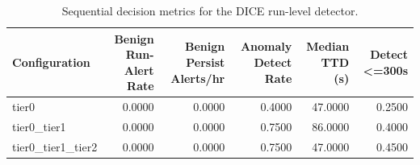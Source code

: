 \begin{table}[t]
\centering
\caption{Sequential decision metrics for the DICE run-level detector.}
\label{tab:dice_sequential_metrics}
\footnotesize
\begin{tabular}{lrrrrr}
\toprule
Configuration & Benign Run-Alert Rate & Benign Persist Alerts/hr & Anomaly Detect Rate & Median TTD (s) & Detect <=300s \\
\midrule
tier0 & 0.0000 & 0.0000 & 0.4000 & 47.0000 & 0.2500 \\
tier0_tier1 & 0.0000 & 0.0000 & 0.7500 & 86.0000 & 0.4000 \\
tier0_tier1_tier2 & 0.0000 & 0.0000 & 0.7500 & 47.0000 & 0.4500 \\
\bottomrule
\end{tabular}

\end{table}
